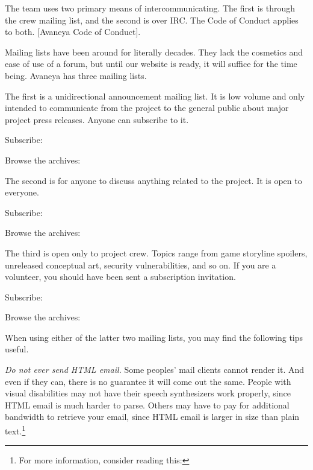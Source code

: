 
The team uses two primary means of intercommunicating. The first is through the crew mailing list, and the second is over IRC. The Code of Conduct applies to both. [Avaneya Code of Conduct].

Mailing lists have been around for literally decades. They lack the cosmetics and ease of use of a forum, but until our website is ready, it will suffice for the time being. Avaneya has three mailing lists. 

The first is a unidirectional announcement mailing list. It is low volume and only intended to communicate from the project to the general public about major project press releases. Anyone can subscribe to it.

Subscribe:\crlf
{} 

Browse the archives:\crlf
{}

The second  is for anyone to discuss anything related to the project. It is open to everyone.

Subscribe:\crlf
{} 

Browse the archives:\crlf
{}

The third  is open only to project crew. Topics range from game storyline spoilers, unreleased conceptual art, security vulnerabilities, and so on. If you are a volunteer, you should have been sent a subscription invitation.

Subscribe:\crlf
{} 

Browse the archives:\crlf
{}

When using either of the latter two mailing lists, you may find the following tips useful.

\startitemize
\item
{\it Do not ever send HTML email.} Some peoples' mail clients cannot render it. And even if they can, there is no guarantee it will come out the same. People with visual disabilities may not have their speech synthesizers work properly, since HTML email is much harder to parse. Others may have to pay for additional bandwidth to retrieve your email, since HTML email is larger in size than plain text.\footnote{For more information, consider reading this: }

